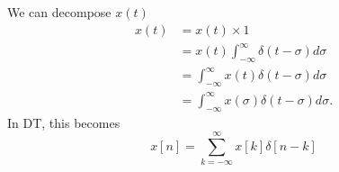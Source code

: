 We can decompose $x(t)$
\begin{align}
    x(t) & = x(t) \times 1                                                  \\
         & = x(t) \int_{-\infty}^{\infty} \delta(t - \sigma) d \sigma       \\
         & = \int_{-\infty}^{\infty} x(t) \delta(t - \sigma) d \sigma       \\
         & = \int_{-\infty}^{\infty} x(\sigma) \delta(t - \sigma) d \sigma.
\end{align}
In DT, this becomes
\begin{equation}
    x[n] = \sum_{k=-\infty}^{\infty} x[k] \delta[n - k]
\end{equation}